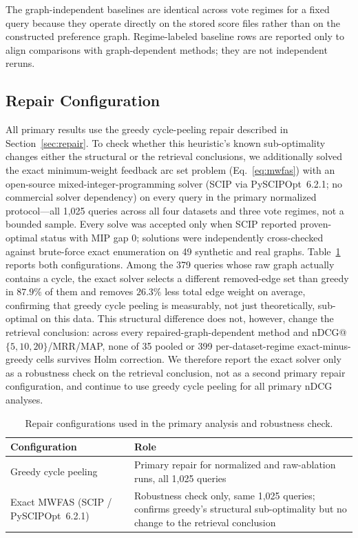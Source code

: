 \documentclass[manuscript,anonymous,review]{acmart}
\begin{document}
The graph-independent baselines are identical across vote regimes for a fixed
query because they operate directly on the stored score files rather than on
the constructed preference graph. Regime-labeled baseline rows are reported
only to align comparisons with graph-dependent methods; they are not
independent reruns.

\subsection{Repair Configuration}
\label{sec:repair-variants}

All primary results use the greedy cycle-peeling repair described in
Section~\ref{sec:repair}. To check whether this heuristic's known
sub-optimality changes either the structural or the retrieval conclusions, we
additionally solved the exact minimum-weight feedback arc set problem
(Eq.~\eqref{eq:mwfas}) with an open-source mixed-integer-programming solver
(SCIP via PySCIPOpt~6.2.1; no commercial solver dependency) on every query in
the primary normalized protocol---all 1{,}025 queries across all four datasets
and three vote regimes, not a bounded sample. Every solve was accepted only
when SCIP reported proven-optimal status with MIP gap $0$; solutions were
independently cross-checked against brute-force exact enumeration on 49
synthetic and real graphs. Table~\ref{tab:repair-variants} reports both
configurations. Among the 379 queries whose raw graph actually contains a
cycle, the exact solver selects a different removed-edge set than greedy in
$87.9\%$ of them and removes $26.3\%$ less total edge weight on average,
confirming that greedy cycle peeling is measurably, not just theoretically,
sub-optimal on this data. This structural difference does not, however, change
the retrieval conclusion: across every repaired-graph-dependent method and
nDCG@$\{5,10,20\}$/MRR/MAP, none of 35 pooled or 399 per-dataset-regime
exact-minus-greedy cells survives Holm correction. We therefore report the
exact solver only as a robustness check on the retrieval conclusion, not as a
second primary repair configuration, and continue to use greedy cycle peeling
for all primary nDCG analyses.

\begin{table}[t]
  \caption{Repair configurations used in the primary analysis and robustness
    check.}
  \label{tab:repair-variants}
  \begin{tabular}{p{4.2cm}p{9.5cm}}
    \toprule
    Configuration & Role \\
    \midrule
    Greedy cycle peeling & Primary repair for normalized and raw-ablation runs, all 1{,}025 queries \\
    Exact MWFAS (SCIP / PySCIPOpt~6.2.1) & Robustness check only, same 1{,}025 queries; confirms greedy's structural sub-optimality but no change to the retrieval conclusion \\
    \bottomrule
  \end{tabular}
\end{table}
\end{document}
